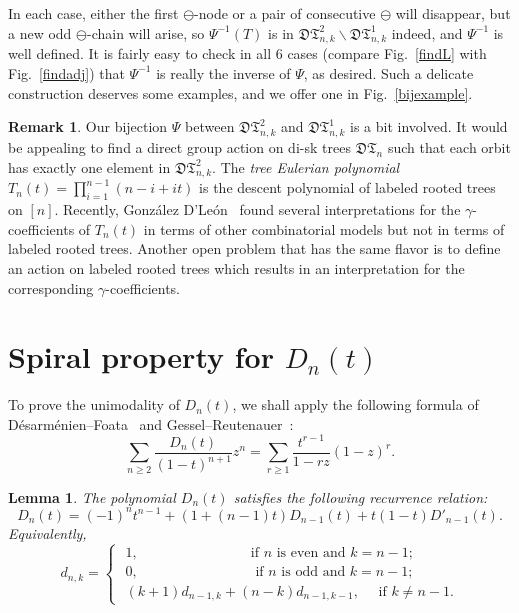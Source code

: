 \documentclass[12pt]{amsart}
\numberwithin{equation}{section}
\theoremstyle{plain}
\newtheorem{lemma}[theorem]{Lemma}
\theoremstyle{definition}
\newtheorem{remark}[theorem]{Remark}
\def\D{\mathfrak{D}}
\def\T{\mathfrak{T}}
\begin{document}
In each case, either the first $\ominus$-node or a pair of consecutive $\ominus$ will disappear, but a new odd $\ominus$-chain will arise, so $\Psi^{-1}(T)$ is in $\D\T^{2}_{n,k}\backslash \D\T^{1}_{n,k}$ indeed, and $\Psi^{-1}$ is well defined. It is fairly easy to check in all 6 cases (compare Fig.~\ref{findL} with Fig.~\ref{findadj}) that $\Psi^{-1}$ is really the inverse of $\Psi$, as desired.
Such a delicate construction deserves some examples, and we offer one in Fig.~\ref{bijexample}.


\begin{remark}
Our bijection $\Psi$ between $\D\T_{n,k}^{2}$ and $\D\T_{n,k}^{1}$ is a bit involved. It would be appealing to find a direct group action on di-sk trees $\D\T_n$ such that each orbit has exactly one element in $\D\T_{n,k}^{2}$. The {\em tree Eulerian polynomial} $T_n(t)=\prod_{i=1}^{n-1}(n-i+it)$ is the descent polynomial of labeled  rooted trees on $[n]$. Recently, Gonz\'alez D'Le\'on~\cite{go} found several  interpretations  for the $\gamma$-coefficients of  $T_n(t)$ in terms of other combinatorial models but not in terms of labeled rooted trees.
Another  open problem that has the same flavor is to 
define an action on labeled rooted trees which results in  an interpretation for the corresponding $\gamma$-coefficients.  
\end{remark}
\section{Spiral property for $D_n(t)$}
\label{sec:spiral}

 To prove the unimodality of $D_n(t)$, we shall apply the following formula of 
 D\'esarm\'enien--Foata~\cite{df} and Gessel--Reutenauer~\cite{ge}:
\begin{equation}\label{gessel}
 \sum_{n\geq2}\frac{D_n(t)}{(1-t)^{n+1}}z^n=\sum_{r\geq1}\frac{t^{r-1}}{1-rz}(1-z)^r.
\end{equation}
 
 \begin{lemma}
 The polynomial $D_n(t)$ satisfies the following recurrence relation:
 \begin{equation}\label{der}
 D_n(t)=(-1)^nt^{n-1}+(1+(n-1)t)D_{n-1}(t)+t(1-t)D'_{n-1}(t).
 \end{equation}
 Equivalently, 
 \begin{equation}\label{recu:der}
 d_{n,k}=
 \begin{cases}
 \,\,1, \qquad\qquad\qquad\qquad\text{if $n$ is even and $k=n-1$;}\\
 \,\,0,\,\,\qquad\qquad\qquad\qquad \text{if $n$ is odd and $k=n-1$;}\\
 \,\,(k+1)d_{n-1,k}+(n-k)d_{n-1,k-1},\,\,\quad\text{if $k\neq n-1$}.
 \end{cases}
 \end{equation}
 \end{lemma}
 
\end{document}
